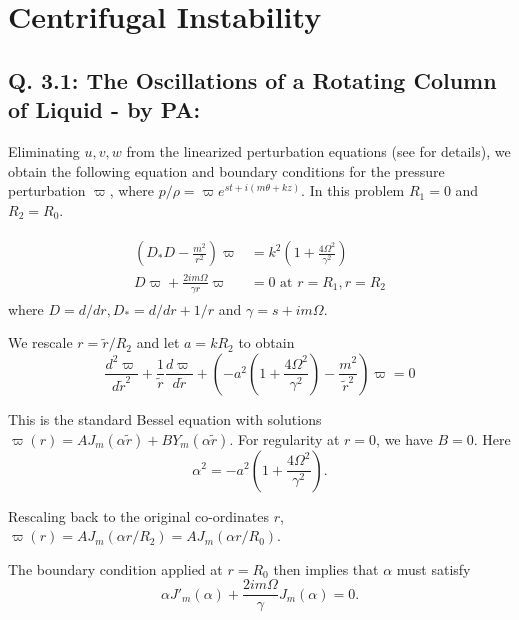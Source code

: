 \chapter{Centrifugal Instability}
\section{Q. 3.1: The Oscillations of a Rotating Column of Liquid - by PA:}
Eliminating $u, v, w$ from the linearized perturbation equations (see \cite{drazin2004hydrodynamic} for details), we obtain the following equation and boundary conditions for the pressure perturbation  $\varpi$, where $p/\rho = \varpi e^{st + i(m\theta + k z)}$. In this problem $R_{1}=0$ and $R_{2}=R_{0}$. 

\begin{align}\label{eq:3_1_pressure_perturbation}
 \begin{split}
    \left(D_{*}D - \frac{m^{2}}{r^{2}} \right)\varpi &= k^{2}\left( 1 + \frac{4\Omega^{2}}{\gamma^{2}}\right)\\
    D\varpi + \frac{2im\Omega}{\gamma r} \varpi &= 0 \textrm{ at } r = R_{1}, r=R_{2} 
 \end{split}
\end{align}
where $D = d/dr, D_{*} = d/dr + 1/r$ and $\gamma = s + i m \Omega$. 

We rescale $r = \tilde{r}/R_{2}$ and let $a = kR_{2}$ to obtain
\begin{equation}\label{eq:3_1_bessel}
 \frac{d^{2}\varpi}{d\tilde{r}^{2}} + \frac{1}{\tilde{r}}\frac{d\varpi}{d\tilde{r}} + \left(-a^{2}\left( 1 + \frac{4\Omega^{2}}{\gamma^{2}}\right) - \frac{m^{2}}{\tilde{r}^{2}} \right)\varpi = 0
\end{equation}

This is the standard Bessel equation with solutions $\varpi(r) = A J_{m}(\alpha \tilde{r}) + B Y_{m}(\alpha \tilde{r})$. For regularity at $r=0$, we have $B = 0$. Here 
\begin{equation}\label{eq:3_1_alpha}
\boxed{\alpha^{2} = -a^{2}\left( 1 + \frac{4\Omega^{2}}{\gamma^{2}}\right)}. 
\end{equation}

Rescaling back to the original co-ordinates $r$, 
$\boxed{\varpi(r) = AJ_{m}(\alpha r/R_{2}) = AJ_{m}(\alpha r/R_{0})}$. 

The boundary condition applied at $r = R_{0}$ then implies that $\alpha$ must satisfy
\begin{equation}\label{eq:3_1_bc}
 \alpha J'_{m}(\alpha) + \frac{2im\Omega}{\gamma} J_{m}(\alpha) = 0.
\end{equation}

